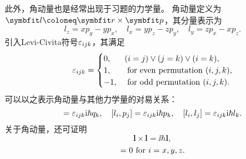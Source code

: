 \begin{tcolorbox}[breakable, colframe=blue, colback=blue!10, title={\textbf{含坐标、动量算符的对易子的计算}}]
    此外，角动量也是经常出现于习题的力学量。
    角动量定义为$\bm{l}\coloneq\rr\times\pp$，其分量表示为
    \begin{equation}
        l_z = x p_y - y p_x,\quad l_x = y p_z - z p_y,\quad l_y = z p_x - x p_z.
    \end{equation}
    引入Levi-Civita符号$\varepsilon_{ijk}$，其满足
    \begin{equation}
        \varepsilon_{ijk} =
        \begin{cases}
            0,  & (i=j) \vee (j=k) \vee (i=k),\\
            1,  & \mathrm{\ for\ even\ permutation\ }(i,j,k),\\
            -1, & \mathrm{\ for\ odd\ permutation\ }(i,j,k).
        \end{cases}
    \end{equation}
    可以以之表示角动量与其他力学量的对易关系：
    \begin{equation}
        [l_i, q_j] = \eps_{ijk} \ii\hbar q_k, \quad
        [l_i, p_j] = \eps_{ijk} \ii\hbar p_k, \quad
        [l_i, l_j] = \eps_{ijk} \ii\hbar l_k.
    \end{equation}
    关于角动量，还可证明
    \begin{equation}
        \bm{l} \times \bm{l} = \ii\hbar\bm{l},
    \end{equation}
    \begin{equation}
        [l^2, l_i] = 0 \rm{\ for\ } i=x,y,z.
    \end{equation}
\end{tcolorbox}

